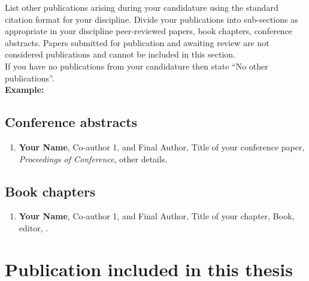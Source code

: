 \begin{instructional}
    List other publications arising during your candidature using the standard citation format for your discipline. Divide your publications into sub-sections as appropriate in your discipline \eg{} peer-reviewed papers, book chapters, conference abstracts. Papers submitted for publication and awaiting review are not considered publications and cannot be included in this section.\\
    
    \noindent
    If you have no publications from your candidature then state ``No other publications''.\\
    
    \textbf{Example:}
    \subsection*{Conference abstracts}

    \begin{enumerate}

    \item \cite{DumyCitationKey} \textbf{Your Name}, Co-author 1, and Final Author, Title of your conference paper, \textit{Proceedings of Conference}, other details.

    \end{enumerate}

    \subsection*{Book chapters}

    \begin{enumerate}

    \item \cite{DumyCitationKey} \textbf{Your Name}, Co-author 1, and Final Author, Title of your chapter, Book, editor, \etc{}.

    \end{enumerate}

\end{instructional}





\section*{Publication included in this thesis}

